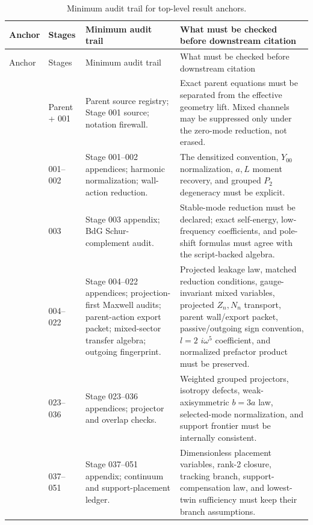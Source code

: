 \begin{longtable}{@{}L{0.12\textwidth}L{0.15\textwidth}L{0.24\textwidth}L{0.34\textwidth}@{}}
\caption{Minimum audit trail for top-level result anchors.}\label{tab:result-anchor-audit-map}\\
\toprule
Anchor & Stages & Minimum audit trail & What must be checked before downstream citation \\
\midrule
\endfirsthead
\toprule
Anchor & Stages & Minimum audit trail & What must be checked before downstream citation \\
\midrule
\endhead
{} & Parent + 001 & Parent source registry; Stage 001 source; notation firewall. & Exact parent equations must be separated from the effective geometry lift.  Mixed channels may be suppressed only under the zero-mode reduction, not erased. \\
\addlinespace
{} & 001--002 & Stage 001--002 appendices; harmonic normalization; wall-action reduction. & The densitized convention, \(Y_{00}\) normalization, \(a,L\) moment recovery, and grouped \(P_2\) degeneracy must be explicit. \\
\addlinespace
{} & 003 & Stage 003 appendix; BdG Schur-complement audit. & Stable-mode reduction must be declared; exact self-energy, low-frequency coefficients, and pole-shift formulas must agree with the script-backed algebra. \\
\addlinespace
{} & 004--022 & Stage 004--022 appendices; projection-first Maxwell audits; parent-action export packet; mixed-sector transfer algebra; outgoing fingerprint. & Projected leakage law, matched reduction conditions, gauge-invariant mixed variables, projected \(Z_n,N_n\) transport, parent wall/export packet, passive/outgoing sign convention, \(l=2\) \(i\omega^5\) coefficient, and normalized prefactor product must be preserved. \\
\addlinespace
{} & 023--036 & Stage 023--036 appendices; projector and overlap checks. & Weighted grouped projectors, isotropy defects, weak-axisymmetric \(b=3a\) law, selected-mode normalization, and support frontier must be internally consistent. \\
\addlinespace
{} & 037--051 & Stage 037--051 appendix; continuum and support-placement ledger. & Dimensionless placement variables, rank-2 closure, tracking branch, support-compensation law, and lowest-twin sufficiency must keep their branch assumptions. \\

\end{longtable}
